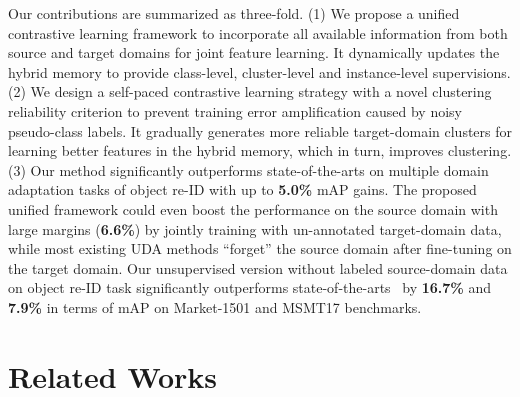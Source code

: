\documentclass{article}
\begin{document}
Our contributions are summarized as three-fold.
(1) 
We propose a unified contrastive learning framework to incorporate all available information from both source and target domains for joint feature learning. It dynamically updates the hybrid memory to provide class-level, cluster-level and instance-level supervisions.
(2) 
We design a self-paced contrastive learning strategy with a novel clustering reliability criterion to prevent training error amplification caused by noisy pseudo-class labels. It gradually generates more reliable target-domain clusters for learning better features in the hybrid memory, which in turn, improves clustering. 
(3) 
Our method significantly outperforms state-of-the-arts \cite{ge2020mutual,zhai2020ad,yang2019selfsimilarity,zhang2019self,wang2020unsupervised} on multiple domain adaptation tasks of object re-ID with up to \textbf{5.0\%} mAP gains. 
The proposed unified framework could even boost the performance on the source domain with large margins (\textbf{6.6\%}) by jointly training with un-annotated target-domain data,
while most existing UDA methods ``forget'' the source domain after fine-tuning on the target domain. 
Our unsupervised version without labeled source-domain data on object re-ID task significantly outperforms state-of-the-arts~\cite{lin2020unsupervised,wang2020unsupervised,zeng2020hierarchical} by \textbf{16.7\%} and \textbf{7.9\%} in terms of mAP on Market-1501 and MSMT17 benchmarks.



\section{Related Works}
\vspace{-5pt}
\end{document}
